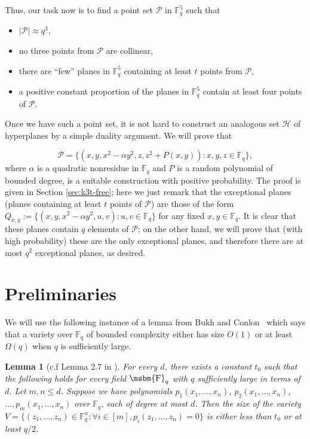 \documentclass[12pt]{article}
\newtheorem{lemma}[theorem]{Lemma}
\newcommand{\FF}{\mbox{\msbm{F}}}
\begin{document}
Thus, our task now is to find a point set $\mathcal{P}$ in $\mathbb{F}_q^5$ such that

\begin{itemize}
    \item $|\mathcal{P}|\approx q^3$,
    \item no three points from $\mathcal{P}$ are collinear,
    \item there are ``few'' planes in $\mathbb{F}_q^5$ containing at least $t$ points from $\mathcal{P}$,
    \item a positive constant proportion of the planes in $\mathbb{F}_q^5$ contain at least four points of $\mathcal{P}$.
\end{itemize}

Once we have such a point set, it is not hard to construct an analogous set $\mathcal{H}$ of hyperplanes by a simple duality argument. We will prove that

$$\mathcal{P}=\{(x,y,x^2-\alpha y^2,z,z^2+P(x,y)): x,y,z\in \mathbb{F}_q\},$$
where $\alpha$ is a quadratic nonresidue in $\mathbb{F}_q$ and $P$ is a random polynomial of bounded degree, is a suitable construction with positive probability. The proof is given in Section \ref{sec:k3t-free}; here we just remark that the exceptional planes (planes containing at least $t$ points of $\mathcal{P}$) are those of the form $Q_{x,y}:=\{(x,y,x^2-\alpha y^2,u,v):u,v\in \mathbb{F}_q\}$ for any fixed $x,y\in \mathbb{F}_q$. It is clear that these planes contain $q$ elements of $\mathcal{P}$; on the other hand, we will prove that (with high probability) these are the only exceptional planes, and therefore there are at most $q^2$ exceptional planes, as desired.

\section{Preliminaries} \label{sec:preliminaries}



We will use the following instance of a lemma from Bukh and Conlon~\cite{bukh2018rational} which says that a variety over $\mathbb{F}_q$ of bounded complexity either has size $O(1)$ or at least $\Omega(q)$ when $q$ is sufficiently large. 

\begin{lemma}[c.f Lemma 2.7 in \cite{bukh2018rational}]\label{boundinglemma}
    For every $d$, there exists a constant $t_0$ such that the following holds for every field $\FF_q$ with $q$ sufficiently large in terms of $d$. Let $m, n \leq d$. Suppose we have polynomials $p_1(x_1, \dots ,x_n)$, $p_2(x_1, \dots ,x_n)$, $\dots ,p_m(x_1, \dots ,x_n)$ over $\mathbb{F}_q$, each of degree at most $d$. Then the size of the variety $V = \{(z_1, \dots ,z_n)\in \mathbb{F}_q^n : \forall i \in [m], p_i(z_1, \dots ,z_n) = 0 \}$ is either less than $t_0$ or at least $q/2$. 
\end{lemma}
\end{document}
